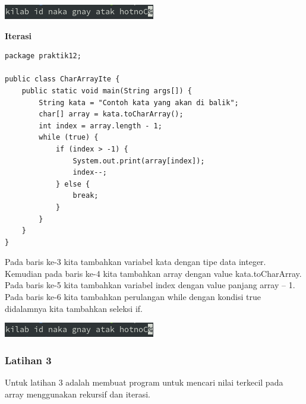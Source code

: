 \documentclass[a4paper,12pt]{article}
\begin{document}
\begin{center}
    \includegraphics[scale=1]{6.png} 
\end{center}

\textbf{Iterasi\\}
\begin{lstlisting}
package praktik12;

public class CharArrayIte {
    public static void main(String args[]) {
        String kata = "Contoh kata yang akan di balik";
        char[] array = kata.toCharArray();
        int index = array.length - 1;
        while (true) {
            if (index > -1) {
                System.out.print(array[index]);
                index--;
            } else {
                break;
            }
        }
    }
}
\end{lstlisting}
Pada baris ke-3 kita tambahkan variabel kata dengan tipe data integer. Kemudian pada baris ke-4 kita tambahkan array dengan value kata.toCharArray. Pada baris ke-5 kita tambahkan variabel index dengan value panjang array – 1. Pada baris ke-6 kita tambahkan perulangan while dengan kondisi true didalamnya kita tambahkan seleksi if.
\begin{center}
    \includegraphics[scale=1]{6.png} 
\end{center}

\subsubsection{Latihan 3}

Untuk latihan 3 adalah membuat program untuk mencari nilai terkecil pada array menggunakan rekursif dan iterasi.\\
\end{document}
